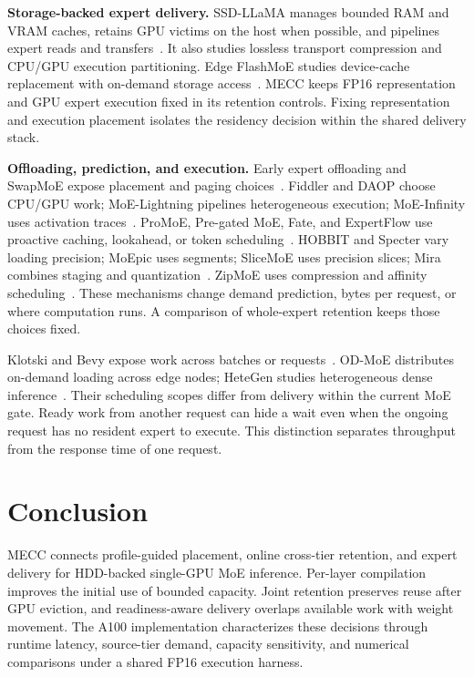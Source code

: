 \documentclass[conference,9pt,letterpaper]{IEEEtran}
\begin{document}
\textbf{Storage-backed expert delivery.} SSD-LLaMA manages bounded RAM and VRAM caches, retains GPU victims on the host when possible, and pipelines expert reads and transfers~\cite{ssdllama}. It also studies lossless transport compression and CPU/GPU execution partitioning. Edge FlashMoE studies device-cache replacement with on-demand storage access~\cite{flashmoe}. MECC keeps FP16 representation and GPU expert execution fixed in its retention controls. Fixing representation and execution placement isolates the residency decision within the shared delivery stack.

\textbf{Offloading, prediction, and execution.} Early expert offloading and SwapMoE expose placement and paging choices~\cite{offloading,swapmoe}. Fiddler and DAOP choose CPU/GPU work; MoE-Lightning pipelines heterogeneous execution; MoE-Infinity uses activation traces~\cite{fiddler,daop,lightning,moeinfinity}. ProMoE, Pre-gated MoE, Fate, and ExpertFlow use proactive caching, lookahead, or token scheduling~\cite{promoe,pregated,fate,expertflow}. HOBBIT and Specter vary loading precision; MoEpic uses segments; SliceMoE uses precision slices; Mira combines staging and quantization~\cite{hobbit,specter,moepic,slicemoe,mira}. ZipMoE uses compression and affinity scheduling~\cite{zipmoe}. These mechanisms change demand prediction, bytes per request, or where computation runs. A comparison of whole-expert retention keeps those choices fixed.

Klotski and Bevy expose work across batches or requests~\cite{klotski,bevy}. OD-MoE distributes on-demand loading across edge nodes; HeteGen studies heterogeneous dense inference~\cite{odmoe,hetegen}. Their scheduling scopes differ from delivery within the current MoE gate. Ready work from another request can hide a wait even when the ongoing request has no resident expert to execute. This distinction separates throughput from the response time of one request.

\section{Conclusion}
MECC connects profile-guided placement, online cross-tier retention, and expert delivery for HDD-backed single-GPU MoE inference. Per-layer compilation improves the initial use of bounded capacity. Joint retention preserves reuse after GPU eviction, and readiness-aware delivery overlaps available work with weight movement. The A100 implementation characterizes these decisions through runtime latency, source-tier demand, capacity sensitivity, and numerical comparisons under a shared FP16 execution harness.

\clearpage
\nobalance
{}


\end{document}
